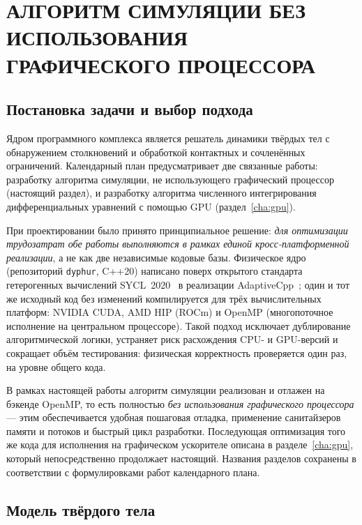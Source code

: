 \chapter{АЛГОРИТМ СИМУЛЯЦИИ БЕЗ ИСПОЛЬЗОВАНИЯ ГРАФИЧЕСКОГО ПРОЦЕССОРА}
\label{cha:cpu}

\section{Постановка задачи и выбор подхода}

Ядром программного комплекса является решатель динамики твёрдых тел с
обнаружением столкновений и обработкой контактных и сочленённых ограничений.
Календарный план предусматривает две связанные работы: разработку алгоритма
симуляции, не использующего графический процессор (настоящий раздел), и
разработку алгоритма численного интегрирования дифференциальных уравнений с
помощью GPU (раздел~\ref{cha:gpu}).

При проектировании было принято принципиальное решение: \emph{для оптимизации
трудозатрат обе работы выполняются в рамках единой кросс-платформенной
реализации}, а не как две независимые кодовые базы. Физическое ядро
(репозиторий \texttt{dyphur}, C++20) написано поверх открытого стандарта
гетерогенных вычислений SYCL~2020~\cite{sycl2020} в реализации
AdaptiveCpp~\cite{alpay2020adaptivecpp}; один и тот же исходный код без
изменений компилируется для трёх вычислительных платформ: NVIDIA CUDA, AMD
HIP (ROCm) и OpenMP (многопоточное исполнение на центральном процессоре).
Такой подход исключает дублирование алгоритмической логики, устраняет риск
расхождения CPU- и GPU-версий и сокращает объём тестирования: физическая
корректность проверяется один раз, на уровне общего кода.

В рамках настоящей работы алгоритм симуляции реализован и отлажен на
бэкенде OpenMP, то есть полностью \emph{без использования графического
процессора} --- этим обеспечивается удобная пошаговая отладка, применение
санитайзеров памяти и потоков и быстрый цикл разработки. Последующая
оптимизация того же кода для исполнения на графическом ускорителе описана в
разделе~\ref{cha:gpu}, который непосредственно продолжает настоящий. Названия
разделов сохранены в соответствии с формулировками работ календарного плана.

\section{Модель твёрдого тела}

